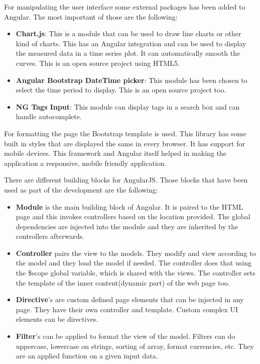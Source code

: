For manipulating the user interface some external packages has been added to Angular. The most important of those are the following:
\begin{itemize}
\item \textbf{Chart.js}: This is a module that can be used to draw line charts or other kind of charts. This has an Angular integration and can be used to display the measured data in a time series plot. It can automatically smooth the curves. This is an open source project using HTML5.
\item \textbf{Angular Bootstrap DateTime picker}: This module has been chosen to select the time period to display. This is an open source project too.
\item \textbf{NG Tags Input}: This module can display tags in a search box and can handle autocomplete. 
\end{itemize}

For formatting the page the Bootstrap template is used. 
This library has some built in styles that are displayed the same in every browser. It has support for mobile devices. This framework and Angular itself helped in making the application a responsive, mobile friendly application.

There are different building blocks for AngularJS. Those blocks that have been used as part of the development are the following:
\begin{itemize}
\item \textbf{Module} is the main building block of Angular. It is paired to the HTML page and this invokes controllers based on the location provided. The global dependencies are injected into the module and they are inherited by the controllers afterwards.
\item \textbf{Controller} pairs the view to the models. They modify and view according to the model and they load the model if needed. The controller does that using the \$scope global variable, which is shared with the views. The controller sets the template of the inner content(dynamic part) of the web page too.
\item \textbf{Directive}'s are custom defined page elements that can be injected in any page. They have their own controller and template. Custom complex UI elements can be directives.
\item \textbf{Filter}'s can be applied to format the view of the model. Filters can do uppercase, lowercase on strings, sorting of array, format currencies, etc. They are an applied function on a given input data.
\end{itemize}

